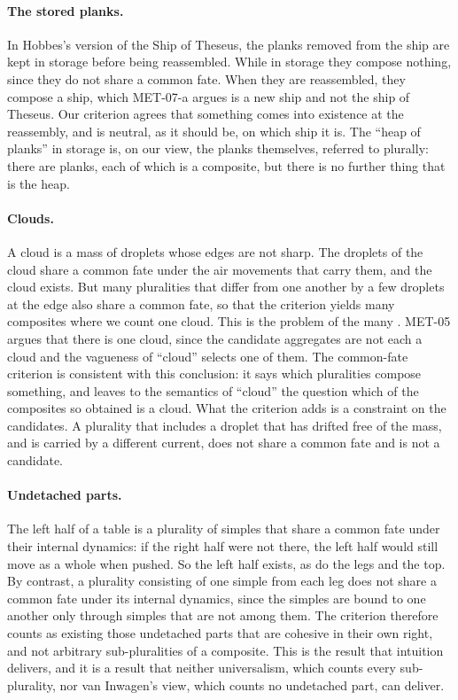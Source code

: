 \documentclass{situationist-preprint}
\begin{document}
\paragraph{The stored planks.} In Hobbes's version of the Ship of Theseus, the planks removed from the ship are kept in storage before being reassembled. While in storage they compose nothing, since they do not share a common fate. When they are reassembled, they compose a ship, which MET-07-a argues is a new ship and not the ship of Theseus. Our criterion agrees that something comes into existence at the reassembly, and is neutral, as it should be, on which ship it is. The \enquote{heap of planks} in storage is, on our view, the planks themselves, referred to plurally: there are planks, each of which is a composite, but there is no further thing that is the heap.

\paragraph{Clouds.} A cloud is a mass of droplets whose edges are not sharp. The droplets of the cloud share a common fate under the air movements that carry them, and the cloud exists. But many pluralities that differ from one another by a few droplets at the edge also share a common fate, so that the criterion yields many composites where we count one cloud. This is the problem of the many \citep{Unger1980}. MET-05 argues that there is one cloud, since the candidate aggregates are not each a cloud and the vagueness of \enquote{cloud} selects one of them. The common-fate criterion is consistent with this conclusion: it says which pluralities compose something, and leaves to the semantics of \enquote{cloud} the question which of the composites so obtained is a cloud. What the criterion adds is a constraint on the candidates. A plurality that includes a droplet that has drifted free of the mass, and is carried by a different current, does not share a common fate and is not a candidate.

\paragraph{Undetached parts.} The left half of a table is a plurality of simples that share a common fate under their internal dynamics: if the right half were not there, the left half would still move as a whole when pushed. So the left half exists, as do the legs and the top. By contrast, a plurality consisting of one simple from each leg does not share a common fate under its internal dynamics, since the simples are bound to one another only through simples that are not among them. The criterion therefore counts as existing those undetached parts that are cohesive in their own right, and not arbitrary sub-pluralities of a composite. This is the result that intuition delivers, and it is a result that neither universalism, which counts every sub-plurality, nor van Inwagen's view, which counts no undetached part, can deliver.
\end{document}
